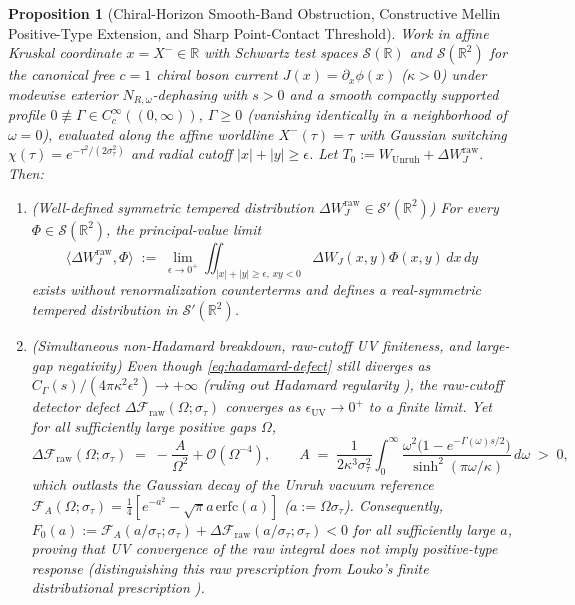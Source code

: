 \documentclass[11pt,a4paper]{article}
\newtheorem{proposition}{Proposition}
\theoremstyle{definition}
\theoremstyle{remark}
\newcommand{\cF}{\mathcal{F}}
\newcommand{\bbR}{\mathbb{R}}
\newcommand{\1}{\mathbf{1}}
\begin{document}
\begin{proposition}[Chiral-Horizon Smooth-Band Obstruction, Constructive Mellin Positive-Type Extension, and Sharp Point-Contact Threshold]\label{prop:smooth-band-contact}
Work in affine Kruskal coordinate $x = X^-\in\bbR$ with Schwartz test spaces $\mathcal{S}(\bbR)$ and $\mathcal{S}(\bbR^2)$ for the canonical free $c=1$ chiral boson current $J(x)=\partial_x\phi(x)$ ($\kappa>0$) under modewise exterior $N_{R,\omega}$-dephasing with $s>0$ and a smooth compactly supported profile $0\not\equiv \Gamma\in C_c^\infty((0,\infty))$, $\Gamma\ge 0$ (vanishing identically in a neighborhood of $\omega=0$), evaluated along the affine worldline $X^-(\tau)=\tau$ with Gaussian switching $\chi(\tau)=e^{-\tau^2/(2\sigma_\tau^2)}$ and radial cutoff $|x|+|y|\ge\epsilon$. Let $T_0 := W_{\mathrm{Unruh}} + \Delta W_J^{\mathrm{raw}}$. Then:
\begin{enumerate}
  \item[(a)] \emph{(Well-defined symmetric tempered distribution $\Delta W_J^{\mathrm{raw}}\in\mathcal{S}'(\bbR^2)$)} For every $\Phi\in\mathcal{S}(\bbR^2)$, the principal-value limit
  \[
    \langle\Delta W_J^{\mathrm{raw}},\Phi\rangle \;:=\; \lim_{\epsilon\to 0^+}\iint_{|x|+|y|\ge\epsilon,\,xy<0}\Delta W_J(x,y)\Phi(x,y)\,dx\,dy
  \]
  exists without renormalization counterterms and defines a real-symmetric tempered distribution in $\mathcal{S}'(\bbR^2)$.
  \item[(b)] \emph{(Simultaneous non-Hadamard breakdown, raw-cutoff UV finiteness, and large-gap negativity)} Even though \eqref{eq:hadamard-defect} still diverges as $C_\Gamma(s)/(4\pi\kappa^2\epsilon^2)\to +\infty$ (ruling out Hadamard regularity \cite{Radzikowski1996,Sanders2015}), the raw-cutoff detector defect $\Delta\cF_{\mathrm{raw}}(\Omega;\sigma_\tau)$ converges as $\epsilon_{\mathrm{UV}}\to 0^+$ to a \emph{finite} limit. Yet for all sufficiently large positive gaps $\Omega$,
  \begin{equation}\label{eq:smooth-band-tail}
    \Delta\cF_{\mathrm{raw}}(\Omega;\sigma_\tau) \;=\; -\frac{A}{\Omega^2} + \mathcal{O}(\Omega^{-4}), \qquad
    A \;=\; \frac{1}{2\kappa^3\sigma_\tau^2}\int_0^\infty \frac{\omega^2\bigl(1 - e^{-\Gamma(\omega)s/2}\bigr)}{\sinh^2(\pi\omega/\kappa)}\,d\omega \;>\; 0,
  \end{equation}
  which outlasts the Gaussian decay of the Unruh vacuum reference $\cF_A(\Omega;\sigma_\tau) = \frac{1}{4}[e^{-a^2}-\sqrt{\pi}a\,\mathrm{erfc}(a)]$ ($a := \Omega\sigma_\tau$). Consequently, $F_0(a) := \cF_A(a/\sigma_\tau;\sigma_\tau) + \Delta\cF_{\mathrm{raw}}(a/\sigma_\tau;\sigma_\tau) < 0$ for all sufficiently large $a$, proving that UV convergence of the raw integral does not imply positive-type response (distinguishing this raw prescription from Louko's finite distributional prescription \cite{Louko2014}).

\end{enumerate}
\end{proposition}
\end{document}
